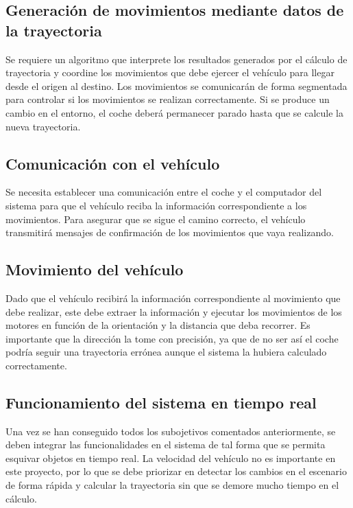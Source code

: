 \subsection{Generación de movimientos mediante datos de la trayectoria}\label{sec:GenerarMovimientos}

Se requiere un algoritmo que interprete los resultados generados por el cálculo de trayectoria y coordine los movimientos que debe ejercer el vehículo para llegar desde el origen al destino. Los movimientos se comunicarán de forma segmentada para controlar si los movimientos se realizan correctamente. Si se produce un cambio en el entorno, el coche deberá permanecer parado hasta que se calcule la nueva trayectoria.

\subsection{Comunicación con el vehículo}\label{sec:ComunicaciónVehículo}

Se necesita establecer una comunicación entre el coche y el computador del sistema para que el vehículo reciba la información correspondiente a los movimientos. Para asegurar que se sigue el camino correcto, el vehículo transmitirá mensajes de confirmación de los movimientos que vaya realizando.

\subsection{Movimiento del vehículo}\label{sec:MovimientoVehículo}

Dado que el vehículo recibirá la información correspondiente al movimiento que debe realizar, este debe extraer la información y ejecutar los movimientos de los motores en función de la orientación y la distancia que deba recorrer. Es importante que la dirección la tome con precisión, ya que de no ser así el coche podría seguir una trayectoria errónea aunque el sistema la hubiera calculado correctamente. 

\subsection{Funcionamiento del sistema en tiempo real}\label{sec:TiempoReal}

Una vez se han conseguido todos los subojetivos comentados anteriormente, se deben integrar las funcionalidades en el sistema de tal forma que se permita esquivar objetos en tiempo real. La velocidad del vehículo no es importante en este proyecto, por lo que se debe priorizar en detectar los cambios en el escenario de forma rápida y calcular la trayectoria sin que se demore mucho tiempo en el cálculo. 